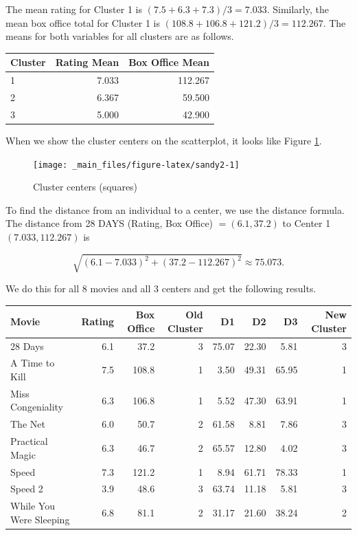 \documentclass[
]{book}
\theoremstyle{definition}
\theoremstyle{definition}
\theoremstyle{definition}
\theoremstyle{definition}
\theoremstyle{remark}
\begin{document}
The mean rating for Cluster 1 is \((7.5+6.3+7.3)/3=7.033.\) Similarly, the mean box office total for Cluster 1 is \((108.8+106.8+121.2)/3=112.267.\) The means for both variables for all clusters are as follows.

\begin{longtable}{lrr}
\toprule
Cluster & Rating Mean & Box Office Mean\\
\midrule
1 & 7.033 & 112.267\\
2 & 6.367 & 59.500\\
3 & 5.000 & 42.900\\
\bottomrule
\end{longtable}

When we show the cluster centers on the scatterplot, it looks like Figure \ref{fig:sandy2}.

\begin{figure}

{\centering \texttt{[image: \_main\_files/figure-latex/sandy2-1]} 

}

\caption{Cluster centers (squares)}\label{fig:sandy2}
\end{figure}

To find the distance from an individual to a center, we use the distance formula. The distance from 28 DAYS (Rating, Box Office) \(=(6.1,37.2)\) to Center 1 \((7.033,112.267)\) is

\[\sqrt{(6.1-7.033)^2+(37.2-112.267)^2}\approx 75.073.\]

We do this for all 8 movies and all 3 centers and get the following results.

\begin{longtable}{lrrrrrrr}
\toprule
Movie & Rating & Box Office & Old Cluster & D1 & D2 & D3 & New Cluster\\
\midrule
28 Days & 6.1 & 37.2 & 3 & 75.07 & 22.30 & 5.81 & 3\\
A Time to Kill & 7.5 & 108.8 & 1 & 3.50 & 49.31 & 65.95 & 1\\
Miss Congeniality & 6.3 & 106.8 & 1 & 5.52 & 47.30 & 63.91 & 1\\
The Net & 6.0 & 50.7 & 2 & 61.58 & 8.81 & 7.86 & 3\\
Practical Magic & 6.3 & 46.7 & 2 & 65.57 & 12.80 & 4.02 & 3\\
Speed & 7.3 & 121.2 & 1 & 8.94 & 61.71 & 78.33 & 1\\
Speed 2 & 3.9 & 48.6 & 3 & 63.74 & 11.18 & 5.81 & 3\\
While You Were Sleeping & 6.8 & 81.1 & 2 & 31.17 & 21.60 & 38.24 & 2\\
\bottomrule
\end{longtable}
\end{document}
